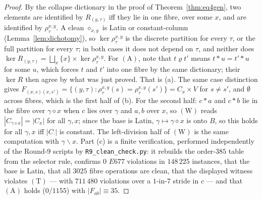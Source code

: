 \documentclass[11pt]{article}
\theoremstyle{plain}
\theoremstyle{definition}
\theoremstyle{remark}
\numberwithin{equation}{section}
\newcommand{\op}{\mathbin{*}}
\begin{document}
\begin{proof}
By the collapse dictionary in the proof of Theorem~\ref{thm:eq4gen}, two elements
are identified by $R_{(y,\tau)}$ iff they lie in one fibre, over some $x$, and
are identified by $\rho^{x,y}_\tau$. A clean $\diamond_{x,y}$ is Latin or
constant-column (Lemma~\ref{lem:dichotomy}), so $\ker\rho^{x,y}_\tau$ is the
discrete partition for every $\tau$, or the full partition for every $\tau$; in
both cases it does not depend on $\tau$, and neither does
$\ker R_{(y,\tau)} = \bigsqcup_x\{x\}\times\ker\rho^{x,y}_\tau$. For
$(\mathrm{A})$, note that $t\mathrel\varrho t'$ means $t\op u = t'\op u$ for some
$u$, which forces $t$ and $t'$ into one fibre by the same dictionary; their
$\ker R$ then agree by what was just proved. That is (a). The same case
distinction gives
$F_{(x,s)(x,s')} = \{(y,\tau) : \rho^{x,y}_\tau(s) = \rho^{x,y}_\tau(s')\}
 = C_x\times V$ for $s\ne s'$, and $\emptyset$ across fibres, which is the first
half of (b). For the second half: $c\op a$ and $c\op b$ lie in the fibre over
$\gamma\diamond x$ when $c$ lies over $\gamma$ and $a,b$ over $x$, so
$(\mathrm{W})$ reads $|C_{\gamma\diamond x}| = |C_x|$ for all $\gamma,x$; since
the base is Latin, $\gamma\mapsto\gamma\diamond x$ is onto $B$, so this holds for
all $\gamma,x$ iff $|C_{\cdot}|$ is constant. The left-division half of
$(\mathrm{W})$ is the same computation with $\gamma\backslash x$. Part (c) is a
finite verification, performed independently of the Round-9 scripts by
\texttt{R9\_clean\_check.py}: it rebuilds the order-$385$ table from the
selector rule, confirms $0$ $E677$ violations in $148\,225$ instances, that the
base is Latin, that all $3025$ fibre operations are clean, that the displayed
witness violates $(\mathrm{T})$ --- with $711\,480$ violations over a $1$-in-$7$
stride in $c$ --- and that $(\mathrm{A})$ holds ($0/1155$) with
$|F_{ab}|\equiv35$.
\end{proof}
\end{document}
